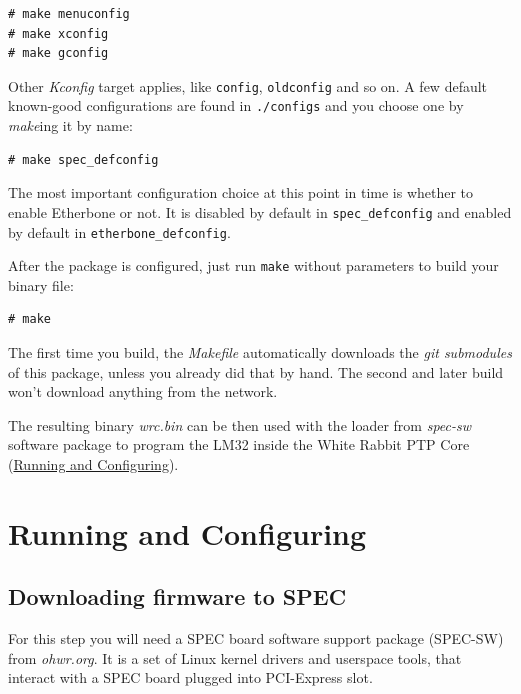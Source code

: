 \documentclass[a4paper, 12pt]{article}
\newcommand{\code}[1]{\texttt{#1}}
\newcommand{\link}[1]{\hyperref[#1]{#1}}
\newcommand{\codeHook}[1]{\mbox{\ttfamily\MakeTextUppercase{#1}}}
\begin{document}
\begin{lstlisting}
# make menuconfig
# make xconfig
# make gconfig
\end{lstlisting}

Other \textit{Kconfig} target applies, like \code{config}, \code{oldconfig}
and so on.  A few default known-good configurations are found in
\texttt{./configs} and you choose one by \textit{make}ing it by name:

\begin{lstlisting}
# make spec_defconfig
\end{lstlisting}

The most important configuration choice at this point in time is
whether to enable Etherbone or not. It is disabled by default in
\code{spec\_defconfig} and enabled by default in
\code{etherbone\_defconfig}.

After the package is configured, just run \code{make} without
parameters to build your binary file:

\begin{lstlisting}
# make
\end{lstlisting}

The first time you build, the \textit{Makefile} automatically downloads
the \textit{git submodules} of this package, unless you already did that
by hand. The second and later build won't download anything
from the network.

The resulting binary \textit{wrc.bin} can be then used with the loader from
\textit{spec-sw} software package to program the \codeHook{lm32} inside the White Rabbit \codeHook{ptp}
Core (\link{Running and Configuring}).

\label{Running and Configuring}
\section{Running and Configuring}

\label{Downloading firmware to SPEC}
\subsection{Downloading firmware to SPEC}

For this step you will need a \codeHook{spec} board software support package
(\codeHook{spec-sw}) from \textit{ohwr.org}. It is a set of Linux kernel drivers and
userspace tools, that interact with a \codeHook{spec} board plugged into PCI-Express
slot.
\end{document}
